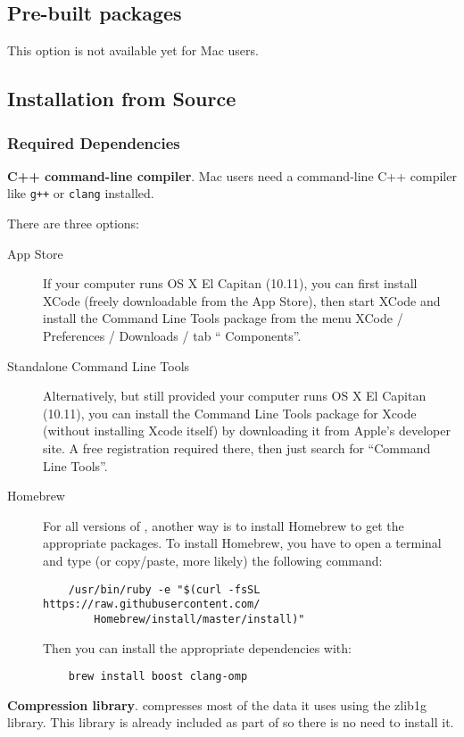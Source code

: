 \subsection{Pre-built packages}
This option is not available yet for Mac users.


\subsection{Installation from Source}
\subsubsection{Required Dependencies}
\begin{myList} 
\item \textbf{C++ command-line compiler}. Mac users need a
  command-line C++ compiler like \verb?g++? or \verb?clang?
  installed.

  There are three options:
  \begin{description}
  \item [App Store] If your computer runs OS X El Capitan (10.11), you
    can first install XCode (freely downloadable from the App Store),
    then start XCode and install the Command Line Tools package from
    the menu XCode / Preferences / Downloads / tab `` Components''.
  \item [Standalone Command Line Tools] Alternatively, but still
    provided your computer runs OS X El Capitan (10.11), you can
    install the Command Line Tools package for Xcode (without
    installing Xcode itself) by downloading it from Apple's developer
    site. A free registration required there, then just search for
    ``Command Line Tools''.
  \item [Homebrew] For all versions of \macos{}, another way is to
    install Homebrew to get the appropriate packages. To install
    Homebrew, you have to open a terminal and type (or copy/paste,
    more likely) the following command:
  \begin{verbatim}
    /usr/bin/ruby -e "$(curl -fsSL https://raw.githubusercontent.com/
        Homebrew/install/master/install)"
  \end{verbatim}

  Then you can install the appropriate dependencies with:
  \begin{verbatim}
    brew install boost clang-omp
  \end{verbatim}
  \end{description}
  
\item \textbf{Compression library}. \aevol{} compresses most of the
  data it uses using the zlib1g library. This library is already
  included as part of \macos{} so there is no need to install it.
\end{myList}
